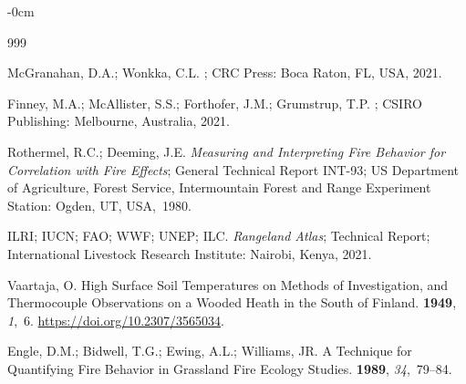\documentclass[fire,article,accept,oneauthor,pdftex]{Definitions/mdpi}
\begin{document}
\begin{adjustwidth}{-\extralength}{0cm}


\begin{thebibliography}{999}

McGranahan, D.A.; Wonkka, C.L.
; CRC Press: Boca Raton, FL, USA, 2021.

Finney, M.A.; McAllister, S.S.; Forthofer, J.M.; Grumstrup, T.P.
; CSIRO Publishing: Melbourne, Australia, %
 2021.

Rothermel, R.C.; Deeming, J.E.
\newblock \emph{Measuring and Interpreting Fire Behavior for Correlation with Fire
  Effects};
\newblock General {{Technical Report}} INT-93; US Department of Agriculture,
  Forest Service, Intermountain Forest and Range Experiment Station: Ogden, UT, USA,~1980.

{ILRI; IUCN; FAO; WWF; UNEP; ILC}.
\newblock \emph{Rangeland Atlas};
\newblock Technical Report; International Livestock Research Institute:
  Nairobi, Kenya,  2021.

Vaartaja, O.
\newblock High {{Surface Soil Temperatures}} on {{Methods}} of
  {{Investigation}}, and {{Thermocouple Observations}} on a {{Wooded Heath}} in
  the {{South}} of {{Finland}}.
 {\bf 1949}, {\em 1},~6.
\url{https://doi.org/10.2307/3565034}.

Engle, {\relax D.M}.; Bidwell, {\relax T.G}.; Ewing, {\relax A.L}.; Williams,
  {\relax JR}.
\newblock A Technique for Quantifying Fire Behavior in Grassland Fire Ecology
  Studies.
 {\bf 1989}, {\em 34},~79--84.


\end{thebibliography}
\end{adjustwidth}
\end{document}
